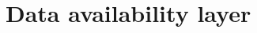 \documentclass[../midgard.tex]{subfiles}
\begin{document}
\section{Data availability layer}
\label{h:data-availability-layer}
\end{document}
